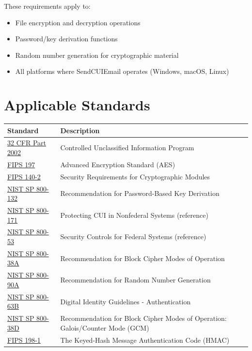 \documentclass[11pt,letterpaper]{article}
\begin{document}
These requirements apply to:
\begin{itemize}[topsep=4pt, itemsep=2pt]
    \item File encryption and decryption operations
    \item Password/key derivation functions
    \item Random number generation for cryptographic material
    \item All platforms where SendCUIEmail operates (Windows, macOS, Linux)
\end{itemize}

\section{Applicable Standards}

\begin{tabularx}{\textwidth}{lX}
\toprule
\textbf{Standard} & \textbf{Description} \\
\midrule
\href{https://www.ecfr.gov/current/title-32/subtitle-B/chapter-XX/part-2002}{32 CFR Part 2002} & Controlled Unclassified Information Program \\
\href{https://csrc.nist.gov/pubs/fips/197/final}{FIPS 197} & Advanced Encryption Standard (AES) \\
\href{https://csrc.nist.gov/pubs/fips/140-2/final}{FIPS 140-2} & Security Requirements for Cryptographic Modules \\
\href{https://csrc.nist.gov/pubs/sp/800/132/final}{NIST SP 800-132} & Recommendation for Password-Based Key Derivation \\
\href{https://csrc.nist.gov/pubs/sp/800/171/r3/final}{NIST SP 800-171} & Protecting CUI in Nonfederal Systems (reference) \\
\href{https://csrc.nist.gov/pubs/sp/800/53/r5/upd1/final}{NIST SP 800-53} & Security Controls for Federal Systems (reference) \\
\href{https://csrc.nist.gov/pubs/sp/800/38/a/final}{NIST SP 800-38A} & Recommendation for Block Cipher Modes of Operation \\
\href{https://csrc.nist.gov/pubs/sp/800/90/a/r1/final}{NIST SP 800-90A} & Recommendation for Random Number Generation \\
\href{https://csrc.nist.gov/pubs/sp/800/63/b/upd2/final}{NIST SP 800-63B} & Digital Identity Guidelines - Authentication \\
\href{https://csrc.nist.gov/pubs/sp/800/38/d/final}{NIST SP 800-38D} & Recommendation for Block Cipher Modes of Operation: Galois/Counter Mode (GCM) \\
\href{https://csrc.nist.gov/pubs/fips/198-1/final}{FIPS 198-1} & The Keyed-Hash Message Authentication Code (HMAC) \\
\bottomrule
\end{tabularx}
\end{document}
